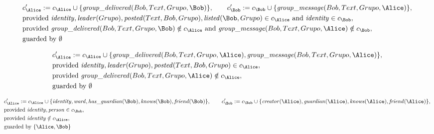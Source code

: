 \begin{align*}
&
c'_
{
\Alice
}
 := 
c_
{
\Alice
}
 \cup 
\{
\mathit{\detokenize{
group_delivered
}}
(
Bob
,
Text
,
Grupo
,
\Bob
)
\}
, \qquad 
c'_
{
\Bob
}
 := 
c_
{
\Bob
}
 \cup 
\{
\mathit{\detokenize{
group_message
}}
(
Bob
,
Text
,
Grupo
,
\Alice
)
\}
,\\
&
\text{provided } 
\mathit{\detokenize{
identity
}}
,
\mathit{\detokenize{
leader
}}
(
Grupo
)
,
\mathit{\detokenize{
posted
}}
(
Text
,
Bob
,
Grupo
)
,
\mathit{\detokenize{
listed
}}
(
\Bob
,
Grupo
)
 \in c_
{
\Alice
}
 \text{ and } 
\mathit{\detokenize{
identity
}}
 \in c_
{
\Bob
}
,\\
&
\text{provided } 
\mathit{\detokenize{
group_delivered
}}
(
Bob
,
Text
,
Grupo
,
\Bob
)
 \notin c_
{
\Alice
}
 \text{ and } 
\mathit{\detokenize{
group_message
}}
(
Bob
,
Text
,
Grupo
,
\Alice
)
 \notin c_
{
\Bob
}
,\\
&
\text{guarded by } \emptyset
\end{align*}

\begin{align*}
&
c'_
{
\Alice
}
 := 
c_
{
\Alice
}
 \cup 
\{
\mathit{\detokenize{
group_delivered
}}
(
Bob
,
Text
,
Grupo
,
\Alice
)
,
\mathit{\detokenize{
group_message
}}
(
Bob
,
Text
,
Grupo
,
\Alice
)
\}
,\\
&
\text{provided } 
\mathit{\detokenize{
identity
}}
,
\mathit{\detokenize{
leader
}}
(
Grupo
)
,
\mathit{\detokenize{
posted
}}
(
Text
,
Bob
,
Grupo
)
 \in c_
{
\Alice
}
,\\
&
\text{provided } 
\mathit{\detokenize{
group_delivered
}}
(
Bob
,
Text
,
Grupo
,
\Alice
)
 \notin c_
{
\Alice
}
,\\
&
\text{guarded by } \emptyset
\end{align*}

\begin{align*}
&
c'_
{
\Alice
}
 := 
c_
{
\Alice
}
 \cup 
\{
\mathit{\detokenize{
identity
}}
,
\mathit{\detokenize{
ward
}}
,
\mathit{\detokenize{
has_guardian
}}
(
\Bob
)
,
\mathit{\detokenize{
knows
}}
(
\Bob
)
,
\mathit{\detokenize{
friend
}}
(
\Bob
)
\}
, \qquad 
c'_
{
\Bob
}
 := 
c_
{
\Bob
}
 \cup 
\{
\mathit{\detokenize{
creator
}}
(
\Alice
)
,
\mathit{\detokenize{
guardian
}}
(
\Alice
)
,
\mathit{\detokenize{
knows
}}
(
\Alice
)
,
\mathit{\detokenize{
friend
}}
(
\Alice
)
\}
,\\
&
\text{provided } 
\mathit{\detokenize{
identity
}}
,
\mathit{\detokenize{
person
}}
 \in c_
{
\Bob
}
,\\
&
\text{provided } 
\mathit{\detokenize{
identity
}}
 \notin c_
{
\Alice
}
,\\
&
\text{guarded by } \{
\Alice
,
\Bob
\}
\end{align*}
